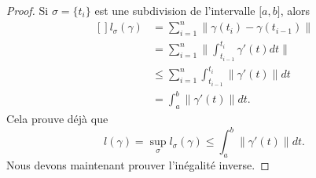 \begin{proof}
    Si $\sigma=\{ t_i \}$ est une subdivision de l'intervalle $\mathopen[ a , b \mathclose]$, alors
    \begin{equation}
        \begin{aligned}[]
            l_{\sigma}(\gamma)&=\sum_{i=1}^n\| \gamma(t_i)-\gamma(t_{i-1}) \|\\
                &=\sum_{i=1}^n\| \int_{t_{i-1}}^{t_i}\gamma'(t)dt \|\\
                &\leq\sum_{i=1}^n\int_{t_{i-1}}^{t_i}\| \gamma'(t) \|dt\\
                &=\int_a^b\| \gamma'(t) \|dt.
        \end{aligned}
    \end{equation}
    Cela prouve déjà que 
    \begin{equation}        \label{Eq_0208lsigsigmmintifp}
        l(\gamma)=\sup_{\sigma}l_{\sigma}(\gamma)\leq\int_a^b\| \gamma'(t) \|dt.
    \end{equation}
    Nous devons maintenant prouver l'inégalité inverse.


\end{proof}
